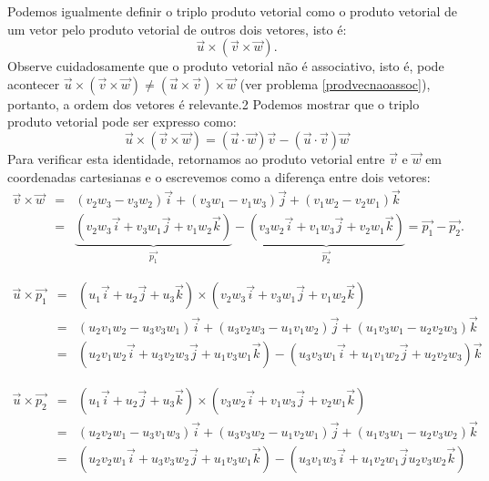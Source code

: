 Podemos igualmente definir o triplo produto vetorial como o produto vetorial de um vetor pelo produto vetorial de outros dois vetores, isto é:
$$\vec{u}\times \left(\vec{v}\times\vec{w}\right). $$
Observe cuidadosamente que o produto vetorial não é associativo, isto é, pode acontecer $\vec{u}\times \left(\vec{v}\times\vec{w}\right)\neq \left(\vec{u}\times \vec{v}\right)\times\vec{w} $ (ver problema \ref{prodvecnaoassoc}), portanto, a ordem dos vetores é relevante.2
Podemos mostrar que o triplo produto vetorial pode ser expresso como:
\begin{equation*}
\vec{u}\times\left(\vec{v}\times\vec{w}\right)=\left(\vec{u}\cdot\vec{w}\right)\vec{v}-\left(\vec{u}\cdot\vec{v}\right)\vec{w}
\end{equation*}
Para verificar esta identidade, retornamos ao produto vetorial entre $\vec{v}$ e $\vec{w}$ em coordenadas cartesianas e o escrevemos como a diferença entre dois vetores:
\begin{eqnarray*} \vec{v}\times\vec{w}&=&\left(v_2w_3-v_3w_2\right)\vec{i}+\left(v_3w_1-v_1w_3\right)\vec{j}+\left(v_1w_2-v_2w_1\right)\vec{k}\\
&=& \underbrace{\left(v_2w_3\vec{i}+v_3w_1\vec{j}+v_1w_2\vec{k}\right)}_{\vec{p_1}} -\underbrace{\left(v_3w_2\vec{i}+v_1w_3\vec{j}+v_2w_1\vec{k}\right)}_{\vec{p_2}}=\vec{p_1}-\vec{p_2}.
\end{eqnarray*}


\begin{eqnarray*}
\vec{u}\times\vec{p_1}&=& \left(u_1\vec{i}+u_2\vec{j}+u_3\vec{k}\right)\times \left(v_2w_3\vec{i}+v_3w_1\vec{j}+v_1w_2\vec{k}\right)\\
&=&\left(u_2v_1w_2-u_3v_3w_1\right)\vec{i}+\left(u_3v_2w_3-u_1v_1w_2\right)\vec{j}+\left(u_1v_3w_1-u_2v_2w_3\right)\vec{k}\\
&=&\left(u_2v_1w_2\vec{i}+u_3v_2w_3\vec{j}+u_1v_3w_1\vec{k}\right)-\left(u_3v_3w_1\vec{i}+u_1v_1w_2\vec{j}+u_2v_2w_3\right)\vec{k}
\end{eqnarray*}

\begin{eqnarray*}
\vec{u}\times\vec{p_2}&=& \left(u_1\vec{i}+u_2\vec{j}+u_3\vec{k}\right)\times \left(v_3w_2\vec{i}+v_1w_3\vec{j}+v_2w_1\vec{k}\right)\\
&=&\left(u_2v_2w_1-u_3v_1w_3\right)\vec{i}+\left(u_3v_3w_2-u_1v_2w_1\right)\vec{j}+\left(u_1v_3w_1-u_2v_3w_2\right)\vec{k}\\
&=&\left(u_2v_2w_1\vec{i}+u_3v_3w_2\vec{j}+u_1v_3w_1\vec{k}\right)
-\left(u_3v_1w_3\vec{i}+u_1v_2w_1\vec{j}u_2v_3w_2\vec{k}\right)
\end{eqnarray*}

